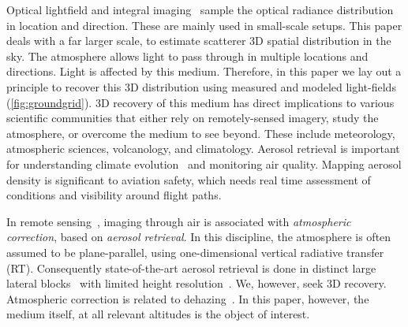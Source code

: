 \documentclass[10pt,letterpaper]{article}
\begin{document}
Optical lightfield and integral imaging~\cite{Stern2006,kim,Ng1948}
sample the optical radiance distribution in location and
direction. These are mainly used in small-scale setups. This paper
deals with a far larger scale, to estimate scatterer 3D spatial
distribution in the sky.  The atmosphere allows light to pass through
in multiple locations and directions. Light is affected by this
medium. Therefore, in this paper we lay out a principle to recover
this 3D distribution using measured and modeled light-fields
(\cref{fig:groundgrid}).  3D recovery of this medium has direct
implications to various scientific communities that either rely on
remotely-sensed imagery, study the atmosphere, or overcome the medium
to see beyond. These include meteorology, atmospheric sciences,
volcanology, and climatology.  Aerosol retrieval is important for
understanding climate evolution~\cite{Dayan2008,kalashnikova} and
monitoring air quality. Mapping aerosol density is significant to
aviation safety, which needs real time assessment of conditions and
visibility around flight paths.

In remote sensing~\cite{Mishchenko2007}, imaging through air
is associated with {\em atmospheric correction}, based on {\em aerosol
  retrieval}. In this discipline, the atmosphere is often assumed to
be plane-parallel, using one-dimensional vertical radiative transfer (RT). Consequently
state-of-the-art aerosol retrieval is done in distinct large lateral
blocks~\cite{Martonchikc} with limited height
resolution~\cite{kalashnikova}. We, however, seek 3D
recovery. Atmospheric correction is related to
dehazing~\cite{Namer2009}. In this paper, however, the medium itself,
at all relevant altitudes is the object of interest.
\end{document}
